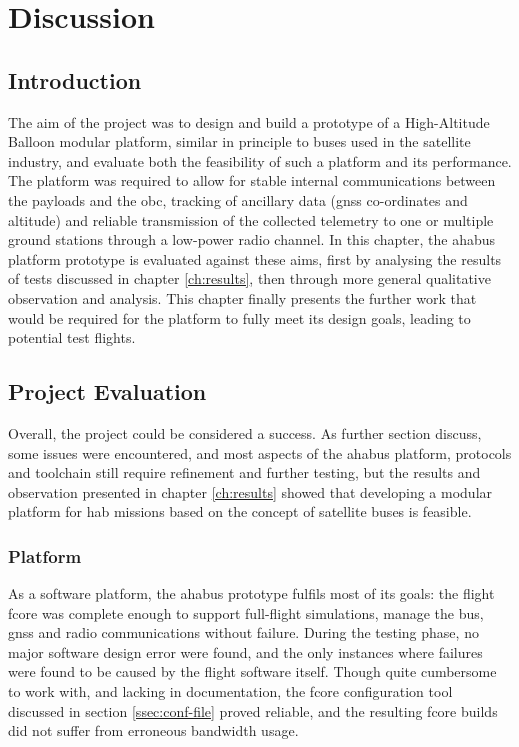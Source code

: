 \chapter{Discussion}
\label{ch:discussion}

\section{Introduction}

The aim of the project was to design and build a prototype of a High-Altitude
Balloon modular platform, similar in principle to buses used in the satellite
industry, and evaluate both the feasibility of such a platform and its
performance. The platform was required to allow for stable internal
communications between the payloads and the \acrlong{obc}, tracking of
ancillary data (\acrshort{gnss} co-ordinates and altitude) and reliable
transmission of the collected telemetry to one or multiple ground stations 
through a low-power radio channel. In this chapter, the \acrshort{ahabus}
platform prototype is evaluated against these aims, first by analysing the
results of tests discussed in chapter \ref{ch:results}, then through more
general qualitative observation and analysis. This chapter finally presents the
further work that would be required for the platform to fully meet its design
goals, leading to potential test flights.

\section{Project Evaluation}

Overall, the project could be considered a success. As further section discuss,
some issues were encountered, and most aspects of the \acrshort{ahabus}
platform, protocols and toolchain still require refinement and further testing,
but the results and observation presented in chapter \ref{ch:results} showed
that developing a modular platform for \acrlong{hab} missions based on the
concept of satellite buses is feasible.

\subsection{Platform}

As a software platform, the \acrshort{ahabus} prototype fulfils most of its
goals: the flight \acrshort{fcore} was complete enough to support full-flight
simulations, manage the bus, \acrshort{gnss} and radio communications without
failure. During the testing phase, no major software design error were found,
and the only instances where failures were found to be caused by the flight
software itself. Though quite cumbersome to work with, and lacking in
documentation, the \acrshort{fcore} configuration tool discussed in section
\ref{ssec:conf-file} proved reliable, and the resulting \acrshort{fcore} builds
did not suffer from erroneous bandwidth usage.


